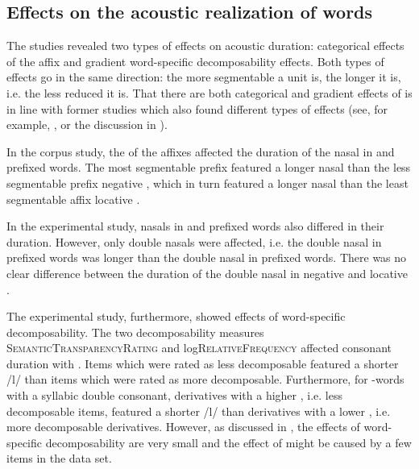 \subsection{Effects on the acoustic realization of words}

The studies revealed two types of  effects on {acoustic duration}: categorical  effects of the affix and gradient word-specific decomposability effects. Both types of effects go in the same direction: the more segmentable a unit is, the  longer it is, i.e. the less reduced it is. That there are both categorical and gradient effects of  is in line with former studies which also found different types of  effects (see, for example, \cite{Schuppler.2012}, or the discussion in ). 

In the corpus study, the  of the affixes affected the duration of the nasal in  and prefixed words. The most segmentable prefix  featured a longer nasal than the less segmentable prefix negative , which in turn featured a longer nasal than the least segmentable affix locative . 


In the experimental study, nasals in  and prefixed words also differed in their duration. However, only double nasals were affected, i.e. the double nasal in prefixed words was longer than the double nasal in prefixed words. There was no clear difference between the duration of the double nasal in negative and locative .

The experimental study, furthermore, showed effects of word-specific decomposability. The two decomposability measures \textsc{SemanticTransparencyRating} and log\textsc{RelativeFrequency} affected consonant duration with . Items which were rated as less decomposable featured a shorter /l/ than items which were rated as more decomposable. Furthermore, for -words with a syllabic double consonant, derivatives with a higher , i.e. less decomposable items, featured a shorter /l/ than derivatives with a lower , i.e. more decomposable derivatives. However, as discussed in , the effects of word-specific decomposability are very small and the effect of  might be caused by a few items in the data set. 



